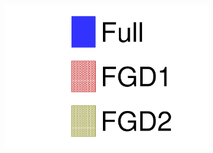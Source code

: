\begin{figure}[h]
\begin{subfigure}[t]{0.32\textwidth}
		\includegraphics[width=\textwidth, trim={0mm 0mm 0mm 0mm}, clip, page=3]{figures/mach3/data/alt/try_2017_fit_on_sk_spectra_posterior_sk_error_fgd1only_spectra_posterior_sk_error_fgd2only_spectra}
	\end{subfigure}
	

\end{figure}
